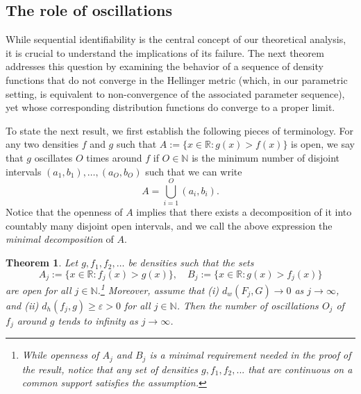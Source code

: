 \documentclass[11pt,twoside]{article}
\newtheorem{theorem}{Theorem}
\def\RR{\mathbb{R}}
\def\NN{\mathbb{N}}
\begin{document}
\subsection{The role of oscillations}

While sequential identifiability is the central concept of our theoretical analysis, it is crucial to understand the implications of its failure. The next theorem addresses this question by examining the behavior of a sequence of density functions that do not converge in the Hellinger metric (which, in our parametric setting, is equivalent to non-convergence of the associated parameter sequence), yet whose corresponding distribution functions do converge to a proper limit.

To state the next result, we first establish the following pieces of terminology. For any two densities $f$ and $g$ such that $A:=\{x\in\RR : g(x)>f(x)\}$ is open, we say that $g$ oscillates $O$ times around $f$ if $O\in\NN$ is the minimum number of disjoint intervals $(a_1, b_1), \dots, (a_O, b_O)$ such that we can write
%
\begin{equation*}
    A = \bigcup_{i=1}^O (a_{i}, b_{i}).
\end{equation*}
%
Notice that the openness of $A$ implies that there exists a decomposition of it into countably many disjoint open intervals, and we call the above expression the \textit{minimal decomposition} of $A$.


\begin{theorem}\label{thm:oscillations}
    Let $g, f_1, f_2,\dots$ be densities such that the sets
    \begin{equation*}
        A_j:=\{x\in\RR : f_j(x)>g(x)\}, \quad B_j:=\{x\in\RR : g(x)>f_j(x)\}
    \end{equation*}
    are open for all $j\in\NN$.\footnote{While openness of $A_j$ and $B_j$ is a minimal requirement needed in the proof of the result, notice that any set of densities $g, f_1, f_2, ...$ that are continuous on a common support satisfies the assumption.} Moreover, assume that (i) $d_w(F_j, G) \to 0$ as $j\to\infty$, and (ii) $d_h(f_j, g) \geq \varepsilon >0$ for all $j\in\NN$. Then the number of oscillations $O_j$ of $f_j$ around $g$ tends to infinity as $j\to\infty$.
\end{theorem}
\end{document}
